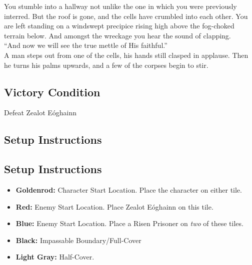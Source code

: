 You stumble into a hallway not unlike the one in which you were previously interred. But the roof is gone, and the cells have crumbled into each other. You are left standing on a windswept precipice rising high above the fog-choked terrain below. And amongst the wreckage you hear the sound of clapping.\\

“And now we will see the true mettle of His faithful.”\\

A man steps out from one of the cells, his hands still clasped in applause. Then he turns his palms upwards, and a few of the corpses begin to stir.\\

\subsection*{Victory Condition}
Defeat Zealot Eóghainn

\subsection*{Setup Instructions}
\begin{center}
\end{center}

\subsection*{Setup Instructions}
\begin{itemize}
\item \textbf{Goldenrod:} Character Start Location. Place the character on either tile.
\item \textbf{Red:} Enemy Start Location. Place Zealot Eóghainn on this tile.
\item \textbf{Blue:} Enemy Start Location. Place a Risen Prisoner on \emph{two} of these tiles.
\item \textbf{Black:} Impassable Boundary/Full-Cover
\item \textbf{Light Gray:} Half-Cover.
\end{itemize}

